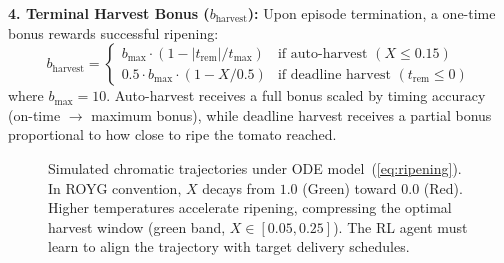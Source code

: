\documentclass[conference]{IEEEtran}
\begin{document}
    \noindent \textbf{4. Terminal Harvest Bonus ($b_{\text{harvest}}$):} Upon episode termination, a one-time bonus rewards successful ripening:
    \begin{equation}
    b_{\text{harvest}} = \begin{cases}
    b_{\max} \cdot (1 - |t_{\text{rem}}| / t_{\max}) & \text{if auto-harvest } (X \leq 0.15) \\
    0.5 \cdot b_{\max} \cdot (1 - X / 0.5) & \text{if deadline harvest } (t_{\text{rem}} \leq 0)
    \end{cases}
    \end{equation}
    \noindent where $b_{\max} = 10$.  Auto-harvest receives a full bonus scaled by timing accuracy (on-time $\to$ maximum bonus), while deadline harvest receives a partial bonus proportional to how close to ripe the tomato reached.
    \begin{figure}[!t]
    \centering
    \caption{Simulated chromatic trajectories under ODE model~(\ref{eq:ripening}).  In ROYG convention, $X$ decays from $1.0$ (Green) toward $0.0$ (Red).  Higher temperatures accelerate ripening, compressing the optimal harvest window (green band, $X \in [0.05, 0.25]$). The RL agent must learn to align the trajectory with target delivery schedules.}
    \label{fig:ripening}
    \end{figure}
\end{document}
